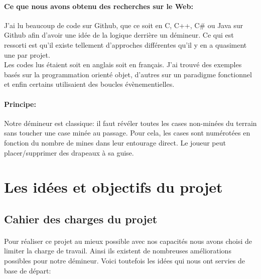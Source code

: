 \documentclass[12pt, a4paper]{article}
\begin{document}
\paragraph{Ce que nous avons obtenu des recherches sur le Web:}
J'ai lu beaucoup de code sur Github, que ce soit en C, C++, C\# ou Java sur
Github afin d'avoir une idée de la logique derrière un démineur. Ce qui est
ressorti est qu'il existe tellement d'approches différentes qu'il y en a
quasiment une par projet. \\
Les codes lus étaient soit en anglais soit en français. J'ai trouvé des
exemples basés sur la programmation orienté objet, d'autres sur un paradigme
fonctionnel et enfin certains utilisaient des boucles évènementielles.

\paragraph{Principe:}
Notre démineur est classique: il faut révéler toutes les cases non-minées du
terrain sans toucher une case minée au passage. Pour cela, les cases sont
numérotées en fonction du nombre de mines dans leur entourage direct.
Le joueur peut placer/supprimer des drapeaux à sa guise.


\newpage

\section{Les idées et objectifs du projet}

\subsection{Cahier des charges du projet}

\paragraph{}
Pour réaliser ce projet au mieux possible avec nos capacités nous avons choisi
de limiter la charge de travail. Ainsi ils existent de nombreuses améliorations
possibles pour notre démineur. Voici toutefois les idées qui nous ont servies
de base de départ: \\
\end{document}
